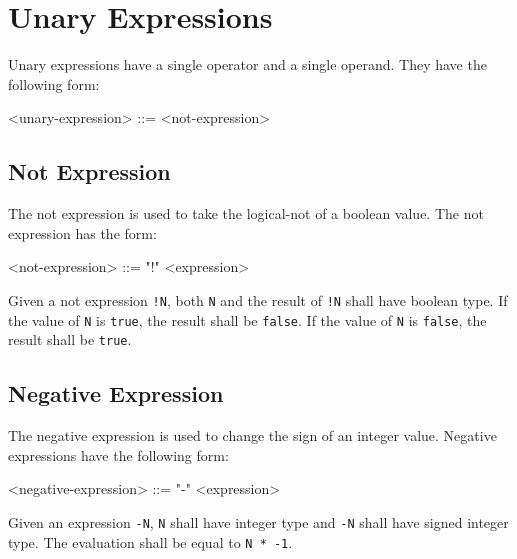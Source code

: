 \section{Unary Expressions} \label{guide:unary_expr}

Unary expressions have a single operator and a single operand. They have the following form:

\begin{minip}
\begin{grammar}
<unary-expression> ::= 
<not-expression>
\end{grammar}
\end{minip}

\subsection{Not Expression} \label{guide:not_expr}

The not expression is used to take the logical-not of a boolean value. The not expression has the form: 

\begin{minip}
\begin{grammar}
<not-expression> ::= "!" <expression> 
\end{grammar}
\end{minip}

Given a not expression \texttt{!N}, both \texttt{N} and the result of \texttt{!N} shall have boolean type. If the value of \texttt{N} is \texttt{true}, the result shall be \texttt{false}. If the value of \texttt{N} is \texttt{false}, the result shall be \texttt{true}.

\subsection{Negative Expression} \label{neg_expr_guide}

The negative expression is used to change the sign of an integer value. Negative expressions have the following form:

\begin{minip}
\begin{grammar}
<negative-expression> ::= "-" <expression>
\end{grammar}
\end{minip}

Given an expression \texttt{-N}, \texttt{N} shall have integer type and \texttt{-N} shall have signed integer type. The evaluation shall be equal to \texttt{N * -1}.

